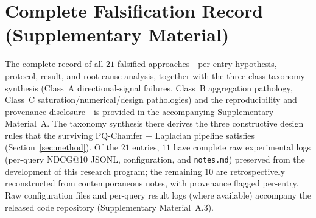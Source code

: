 \documentclass[review,1p]{elsarticle}
\begin{document}
\section{Complete Falsification Record (Supplementary Material)}
\label{app:falsification}

The complete record of all $21$ falsified approaches---per-entry hypothesis, protocol, result, and root-cause analysis, together with the three-class taxonomy synthesis (Class~A directional-signal failures, Class~B aggregation pathology, Class~C saturation/numerical/design pathologies) and the reproducibility and provenance disclosure---is provided in the accompanying Supplementary Material~A. The taxonomy synthesis there derives the three constructive design rules that the surviving PQ-Chamfer + Laplacian pipeline satisfies (Section~\ref{sec:method}). Of the $21$ entries, $11$ have complete raw experimental logs (per-query NDCG@10 JSONL, configuration, and \texttt{notes.md}) preserved from the development of this research program; the remaining $10$ are retrospectively reconstructed from contemporaneous notes, with provenance flagged per-entry. Raw configuration files and per-query result logs (where available) accompany the released code repository (Supplementary Material~A.3).
\end{document}
